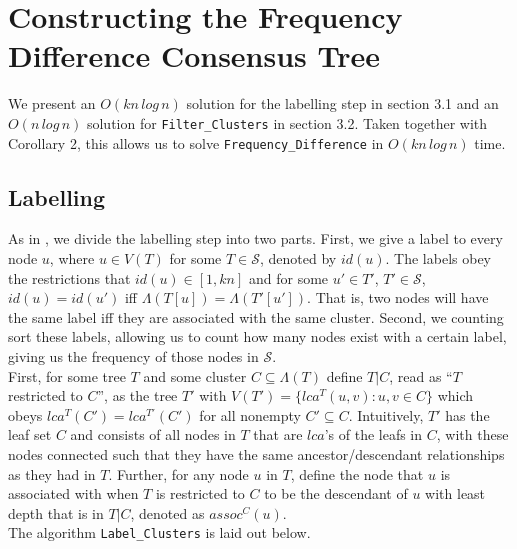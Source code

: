 \documentclass{article}
\newcommand{\leafset}{\Lambda}
\begin{document}
    \section{Constructing the Frequency Difference Consensus Tree}
    \label{sec:freqdiffconstruction}

    We present an $O(kn\,log\,n)$ solution for the labelling step in section 3.1 and an $O(n\,log\,n)$ solution for \texttt{Filter\_Clusters} in section 3.2. Taken together with Corollary 2, this allows us to solve \texttt{Frequency\_Difference} in $O(kn\,log\,n)$ time.

    \subsection{Labelling}
    As in \cite{gawrychowski2017faster}, we divide the labelling step into two parts. First, we give a label to every node $u$, where $u \in V(T)$ for some $T \in \mathcal{S}$, denoted by $id(u)$. The labels obey the restrictions that $id(u) \in [1, kn]$ and for some $u' \in T'$, $T' \in \mathcal{S}$, $id(u) = id(u')$ iff $\leafset(T[u]) = \leafset(T'[u'])$. That is, two nodes will have the same label iff they are associated with the same cluster. Second, we counting sort these labels, allowing us to count how many nodes exist with a certain label, giving us the frequency of those nodes in $\mathcal{S}$.\\

    First, for some tree $T$ and some cluster $C \subseteq \leafset(T)$ define $T|C$, read as ``$T$ restricted to $C$'', as the tree $T'$ with $V(T') = \{lca^T(u, v) : u, v \in C\}$ which obeys $lca^T(C') = lca^{T'}(C')$ for all nonempty $C' \subseteq C$. Intuitively, $T'$ has the leaf set $C$ and consists of all nodes in $T$ that are $lca$'s of the leafs in $C$, with these nodes connected such that they have the same ancestor/descendant relationships as they had in $T$. Further, for any node $u$ in $T$, define the node that $u$ is associated with when $T$ is restricted to $C$ to be the descendant of $u$ with least depth that is in $T|C$, denoted as $assoc^{C}(u)$.\\

    The algorithm \texttt{Label\_Clusters} is laid out below.
\end{document}
